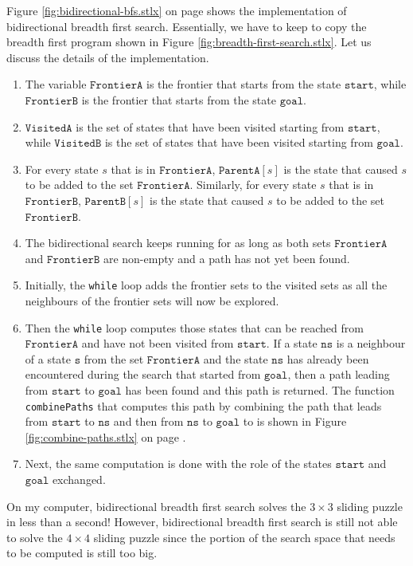 Figure \ref{fig:bidirectional-bfs.stlx} on page \pageref{fig:bidirectional-bfs.stlx} shows the implementation
of bidirectional breadth first search.  Essentially, we have to keep to copy the breadth first program shown in
Figure \ref{fig:breadth-first-search.stlx}. Let us discuss the details of the implementation.
\begin{enumerate}
\item The variable $\mathtt{FrontierA}$ is the frontier that starts from the state $\mathtt{start}$, while
      $\mathtt{FrontierB}$ is the frontier that starts from the state $\mathtt{goal}$.
\item $\mathtt{VisitedA}$ is the set of states that have been visited starting from $\mathtt{start}$, while
      $\mathtt{VisitedB}$ is the set of states that have been visited starting from $\mathtt{goal}$.
\item For every state $s$ that is in $\mathtt{FrontierA}$, $\mathtt{ParentA}[s]$ is the state that caused $s$
      to be added to the set $\mathtt{FrontierA}$.  Similarly, for every state $s$ that is in $\mathtt{FrontierB}$,
      $\mathtt{ParentB}[s]$ is the state that caused $s$ to be added to the set $\mathtt{FrontierB}$.  
\item The bidirectional search keeps running for as long as both sets $\mathtt{FrontierA}$ and
      $\mathtt{FrontierB}$ are non-empty and a path has not yet been found.
\item Initially, the \texttt{while} loop adds the frontier sets to the visited sets
      as all the neighbours of the frontier sets will now be explored.
\item Then the \texttt{while} loop computes those states that can be reached from $\mathtt{FrontierA}$ and have not been
      visited from $\mathtt{start}$.  If a state $\mathtt{ns}$ is a neighbour of a state $\mathtt{s}$ from the set 
      $\mathtt{FrontierA}$ and the state $\mathtt{ns}$ has already been encountered during the search that started
      from $\mathtt{goal}$, then a path leading from $\mathtt{start}$ to $\mathtt{goal}$ has been found and this path
      is returned.  The function \texttt{combinePaths} that computes this path by combining the path that leads
      from $\mathtt{start}$ to $\mathtt{ns}$ and then from $\mathtt{ns}$ to $\mathtt{goal}$ to is shown in Figure
      \ref{fig:combine-paths.stlx} on page \pageref{fig:combine-paths.stlx}.
\item Next, the same computation is done with the role of the states $\mathtt{start}$ and $\mathtt{goal}$ exchanged.
\end{enumerate}
On my computer, bidirectional breadth first search solves the $3 \times 3$ sliding puzzle in less than a
second!  However, bidirectional breadth first search is still not able to solve the $4 \times 4$ sliding puzzle
since the portion of the search space that needs to be computed is still too big.

